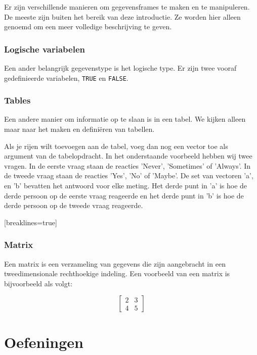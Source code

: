 Er zijn verschillende manieren om gegevensframes te maken en te manipuleren. De meeste zijn buiten het bereik van deze introductie. Ze worden hier alleen genoemd om een meer volledige beschrijving te geven. 



\subsubsection{Logische variabelen}

Een ander belangrijk gegevenstype is het logische type. Er zijn twee vooraf gedefinieerde variabelen, \texttt{TRUE} en \texttt{FALSE}.

\subsubsection{Tables}

Een andere  manier om informatie op te slaan is in een tabel.  We kijken alleen maar naar het maken en defini\"eren van tabellen. 


Als je rijen wilt toevoegen aan de tabel, voeg dan nog een vector toe als argument van de tabelopdracht. In het onderstaande voorbeeld hebben wij twee vragen. In de eerste vraag staan de reacties  'Never', 'Sometimes' of 'Always'. In de tweede vraag staan de reacties 'Yes', 'No' of 'Maybe'. De set van vectoren 'a', en 'b' bevatten het antwoord voor elke meting. Het derde punt in 'a' is hoe de derde persoon op de eerste vraag reageerde en het derde punt in 'b' is hoe de derde persoon op de tweede vraag reageerde.

[breaklines=true]

\subsubsection{Matrix}

Een matrix is een verzameling van gegevens die zijn aangebracht in een tweedimensionale rechthoekige indeling. Een voorbeeld van een matrix is bijvoorbeeld als volgt:

\[
\begin{bmatrix}
2 & 3 \\ 
4 & 5  
\end{bmatrix}
\]



\section{Oefeningen}


